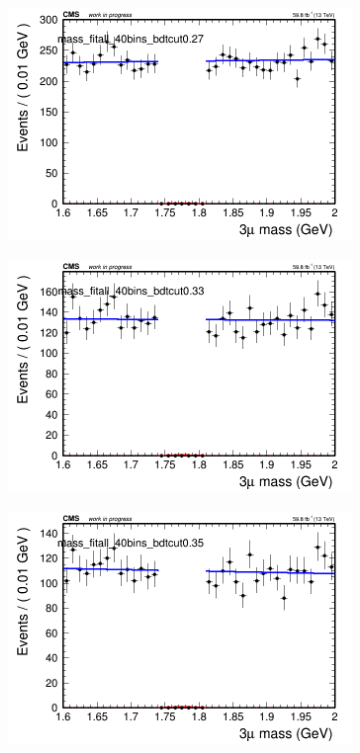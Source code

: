 \begin{figure}[H]
\begin{subfigure}{0.2\textwidth}
        \caption{}
    \end{subfigure}
    \begin{subfigure}{0.2\textwidth}
        \includegraphics[width=\textwidth]{unfixed_exp/plots/all/massfit_all_40bins_bdtcut0.27.png}
        \caption{}
    \end{subfigure}
    \begin{subfigure}{0.2\textwidth}
        \includegraphics[width=\textwidth]{unfixed_exp/plots/all/massfit_all_40bins_bdtcut0.33.png}
        \caption{}
    \end{subfigure}
    \begin{subfigure}{0.2\textwidth}
        \includegraphics[width=\textwidth]{unfixed_exp/plots/all/massfit_all_40bins_bdtcut0.35.png}

\end{subfigure}
\end{figure}
